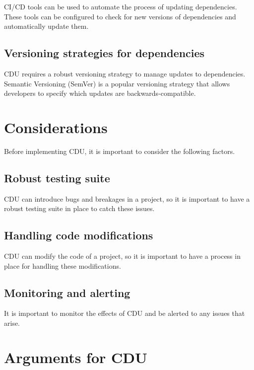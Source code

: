 \documentclass{article}
\begin{document}
CI/CD tools can be used to automate the process of updating dependencies. These tools can be configured to check for new versions of dependencies and automatically update them.

\subsection{Versioning strategies for dependencies}
\label{subsec:versioning-strategies-for-dependencies}

CDU requires a robust versioning strategy to manage updates to dependencies. Semantic Versioning (SemVer) is a popular versioning strategy that allows developers to specify which updates are backwards-compatible.

\section{Considerations}
\label{sec:considerations}

Before implementing CDU, it is important to consider the following factors.

\subsection{Robust testing suite}
\label{subsec:robust-testing-suite}

CDU can introduce bugs and breakages in a project, so it is important to have a robust testing suite in place to catch these issues.

\subsection{Handling code modifications}
\label{subsec:handling-code-modifications}

CDU can modify the code of a project, so it is important to have a process in place for handling these modifications.

\subsection{Monitoring and alerting}
\label{subsec:monitoring-and-alerting}

It is important to monitor the effects of CDU and be alerted to any issues that arise.

\section{Arguments for CDU}
\label{sec:arguments-for-cdu}
\end{document}
